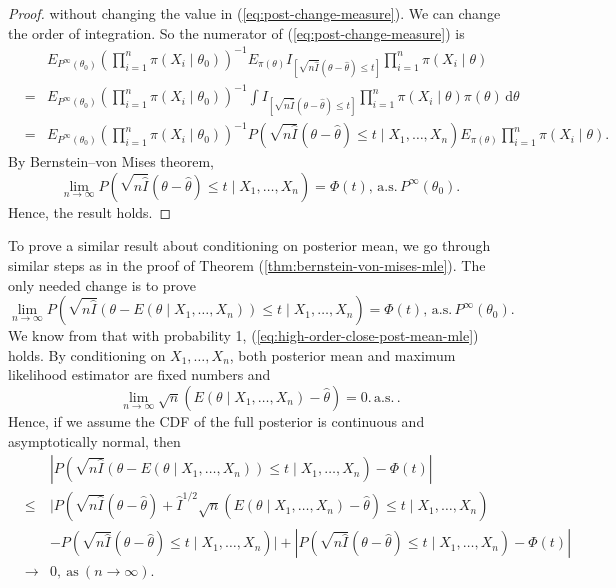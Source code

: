 \documentclass[oneside,english]{amsbook}
\numberwithin{section}{chapter}
\numberwithin{equation}{section}
\numberwithin{figure}{section}
\theoremstyle{plain}
\theoremstyle{plain}
\theoremstyle{definition}
\theoremstyle{plain}
\theoremstyle{plain}
\theoremstyle{remark}
\theoremstyle{definition}
\theoremstyle{definition}
\newcommand{\diff}{\,\mathrm{d}}
\newcommand{\ascv}{\,\mathrm{a.s.}\,}
\begin{document}
\begin{proof}
without changing the value in (\ref{eq:post-change-measure}). We
can change the order of integration. So the numerator of (\ref{eq:post-change-measure})
is 
\begin{eqnarray*}
 &  & E_{P^{\infty}\left(\theta_{0}\right)}\left(\prod_{i=1}^{n}\pi\left(X_{i}\mid\theta_{0}\right)\right)^{-1}E_{\pi\left(\theta\right)}I_{\left[\sqrt{n\hat{I}}\left(\theta-\hat{\theta}\right)\le t\right]}\prod_{i=1}^{n}\pi\left(X_{i}\mid\theta\right)\\
 & = & E_{P^{\infty}\left(\theta_{0}\right)}\left(\prod_{i=1}^{n}\pi\left(X_{i}\mid\theta_{0}\right)\right)^{-1}\int I_{\left[\sqrt{n\hat{I}}\left(\theta-\hat{\theta}\right)\le t\right]}\prod_{i=1}^{n}\pi\left(X_{i}\mid\theta\right)\pi\left(\theta\right)\diff\theta\\
 & = & E_{P^{\infty}\left(\theta_{0}\right)}\left(\prod_{i=1}^{n}\pi\left(X_{i}\mid\theta_{0}\right)\right)^{-1}P\left(\sqrt{n\hat{I}}\left(\theta-\hat{\theta}\right)\le t\mid X_{1},\ldots,X_{n}\right)E_{\pi\left(\theta\right)}\prod_{i=1}^{n}\pi\left(X_{i}\mid\theta\right).
\end{eqnarray*}
By Bernstein--von Mises theorem, 
\[
\lim_{n\rightarrow\infty}P\left(\sqrt{n\hat{I}}\left(\theta-\hat{\theta}\right)\le t\mid X_{1},\ldots,X_{n}\right)=\Phi\left(t\right),\ascv P^{\infty}\left(\theta_{0}\right).
\]
Hence, the result holds.
\end{proof}
To prove a similar result about conditioning on posterior mean, we
go through similar steps as in the proof of Theorem (\ref{thm:bernstein-von-mises-mle}).
The only needed change is to prove 
\[
\lim_{n\rightarrow\infty}P\left(\sqrt{n\hat{I}}\left(\theta-E\left(\theta\mid X_{1},\ldots,X_{n}\right)\right)\le t\mid X_{1},\ldots,X_{n}\right)=\Phi\left(t\right),\ascv P^{\infty}\left(\theta_{0}\right).
\]
We know from \citet{ghosh2011moment} that with probability 1, (\ref{eq:high-order-close-post-mean-mle})
holds. By conditioning on $X_{1},\ldots,X_{n}$, both posterior mean
and maximum likelihood estimator are fixed numbers and 
\[
\lim_{n\rightarrow\infty}\sqrt{n}\left(E\left(\theta\mid X_{1},\ldots,X_{n}\right)-\hat{\theta}\right)=0.\ascv.
\]
 Hence, {{} } {if we assume the CDF of
the full posterior is continuous and asymptotically normal, then 
\begin{eqnarray*}
 &  & \left|P\left(\sqrt{n\hat{I}}\left(\theta-E\left(\theta\mid X_{1},\ldots,X_{n}\right)\right)\le t\mid X_{1},\ldots,X_{n}\right)-\Phi\left(t\right)\right|\\
 & \le & \Bigg|P\left(\sqrt{n\hat{I}}\left(\theta-\hat{\theta}\right)+\hat{I}^{1/2}\sqrt{n}\left(E\left(\theta\mid X_{1},\ldots,X_{n}\right)-\hat{\theta}\right)\le t\mid X_{1},\ldots,X_{n}\right)\\
 &  & -P\left(\sqrt{n\hat{I}}\left(\theta-\hat{\theta}\right)\le t\mid X_{1},\ldots,X_{n}\right)\Bigg|+\left|P\left(\sqrt{n\hat{I}}\left(\theta-\hat{\theta}\right)\le t\mid X_{1},\ldots,X_{n}\right)-\Phi\left(t\right)\right|\\
 & \rightarrow & 0,\mathrm{\: as\:}\left(n\rightarrow\infty\right).
\end{eqnarray*}
}
\end{document}
